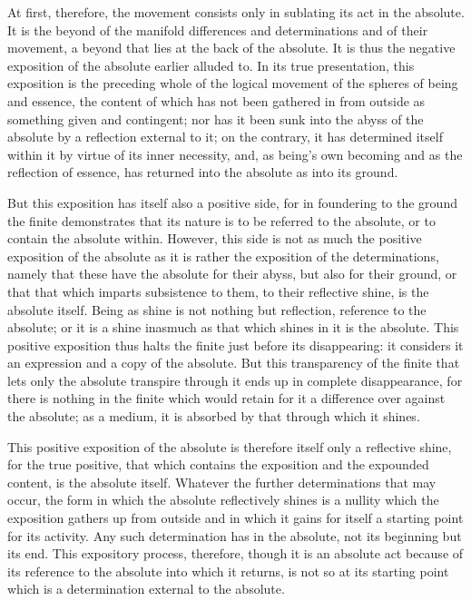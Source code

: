 At first, therefore, the movement consists only
in sublating its act in the absolute.
It is the beyond of the manifold differences
and determinations and of their movement,
a beyond that lies at the back of the absolute.
It is thus the negative exposition of the absolute
earlier alluded to.
In its true presentation, this exposition is
the preceding whole of the logical movement
of the spheres of being and essence,
the content of which has not been gathered in
from outside as something given and contingent;
nor has it been sunk into the abyss of the absolute
by a reflection external to it;
on the contrary, it has determined itself within it
by virtue of its inner necessity,
and, as being's own becoming
and as the reflection of essence,
has returned into the absolute
as into its ground.

But this exposition has itself also a positive side,
for in foundering to the ground the finite demonstrates
that its nature is to be referred to the absolute,
or to contain the absolute within.
However, this side is not as much
the positive exposition of the absolute
as it is rather the exposition of the determinations,
namely that these have the absolute for their abyss,
but also for their ground,
or that that which imparts subsistence to them,
to their reflective shine, is the absolute itself.
Being as shine is not nothing but reflection,
reference to the absolute;
or it is a shine inasmuch as
that which shines in it is the absolute.
This positive exposition thus halts the finite
just before its disappearing:
it considers it an expression and
a copy of the absolute.
But this transparency of the finite
that lets only the absolute transpire through it
ends up in complete disappearance,
for there is nothing in the finite
which would retain for it a difference
over against the absolute;
as a medium, it is absorbed by
that through which it shines.

This positive exposition of the absolute is
therefore itself only a reflective shine,
for the true positive, that which contains
the exposition and the expounded content,
is the absolute itself.
Whatever the further determinations that may occur,
the form in which the absolute reflectively shines is
a nullity which the exposition gathers up from outside
and in which it gains for itself
a starting point for its activity.
Any such determination has in the absolute,
not its beginning but its end.
This expository process, therefore,
though it is an absolute act
because of its reference to
the absolute into which it returns,
is not so at its starting point
which is a determination
external to the absolute.

